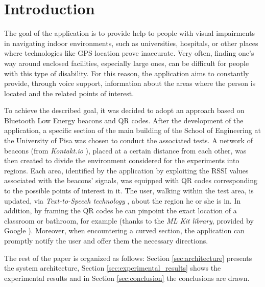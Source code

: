\section{Introduction}

The goal of the application is to provide help to people with visual impairments in navigating indoor environments, such as universities, hospitals, or other places where technologies like GPS location prove inaccurate. Very often, finding one's way around enclosed facilities, especially large ones, can be difficult for people with this type of disability. For this reason, the application aims to constantly provide, through voice support, information about the areas where the person is located and the related points of interest.

To achieve the described goal, it was decided to adopt an approach based on Bluetooth Low Energy beacons and QR codes.
After the development of the application, a specific section of the main building of the School of Engineering at the University of Pisa was chosen to conduct the associated tests. A network of beacons (from \textit{Kontakt.io} \cite{kontakt:beacons}), placed at a certain distance from each other, was then created to divide the environment considered for the experiments into regions. Each area, identified by the application by exploiting the RSSI values associated with the beacons' signals, was equipped with QR codes corresponding to the possible points of interest in it. The user, walking within the test area, is updated, via \textit{Text-to-Speech technology} \cite{android:text-to-speech-ref}, about the region he or she is in. In addition, by framing the QR codes he can pinpoint the exact location of a classroom or bathroom, for example (thanks to the \textit{ML Kit library}, provided by Google \cite{android:mlkit:overview}). Moreover, when encountering a curved section, the application can promptly notify the user and offer them the necessary directions. 

The rest of the paper is organized as follows: Section \vref{sec:architecture} presents the system architecture, Section \vref{sec:experimental_results} shows the experimental results and in Section \vref{sec:conclusion} the conclusions are drawn.
